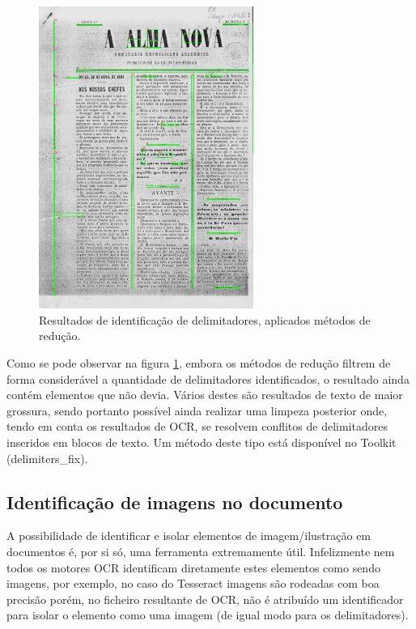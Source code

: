\begin{figure}[H]
	\centering
	\includegraphics[width=7cm]{images/ilustracoes/get_delimiters_final_example.png}
	\caption{Resultados de identificação de delimitadores, aplicados métodos de redução.}
	\label{fig:get_delimiters_final_example}
\end{figure}

Como se pode observar na figura \ref{fig:get_delimiters_final_example}, embora os métodos de redução filtrem de forma considerável a quantidade de delimitadores identificados, o resultado ainda contém elementos que não devia. Vários destes são resultados de texto de maior grossura, sendo portanto possível ainda realizar uma limpeza posterior onde, tendo em conta os resultados de OCR, se resolvem conflitos de delimitadores inseridos em blocos de texto. Um método deste tipo está disponível no Toolkit (delimiters\_fix).


\subsection{Identificação de imagens no documento}
\label{contribution_image_document_image_identification}


A possibilidade de identificar e isolar elementos de imagem/ilustração em documentos é, por si só, uma ferramenta extremamente útil. Infelizmente nem todos os motores OCR identificam diretamente estes elementos como sendo imagens, por exemplo, no caso do Tesseract imagens são rodeadas com boa precisão porém, no ficheiro resultante de OCR, não é atribuído um identificador para isolar o elemento como uma imagem (de igual modo para os delimitadores). 

